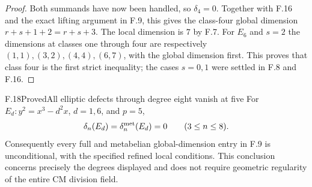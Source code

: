 \begin{proof}
Both summands have now been handled, so $\delta_4=0$.
Together with F.16 and the exact lifting argument in F.9,
this gives the class-four global dimension $r+s+1+2=r+s+3$.
The local dimension is $7$ by F.7. For $E_6$ and $s=2$
the dimensions at classes one through four are respectively
$(1,1),(3,2),(4,4),(6,7)$, with the global dimension first.
This proves that class four is the first strict inequality;
the cases $s=0,1$ were settled in F.8 and F.16.
\end{proof}

\begin{statement}{F.18}{Proved}{All elliptic defects through degree eight vanish at five}
For $E_d:y^2=x^3-d^2x$, $d=1,6$, and $p=5$,
\[
 \delta_n(E_d)=\delta_n^{\rm met}(E_d)=0
       \qquad(3\le n\le8).
\]
Consequently every full and metabelian global-dimension entry
in F.9 is unconditional, with the specified refined local conditions.
This conclusion concerns precisely the degrees displayed and
does not require geometric regularity of the entire CM division field.
\end{statement}

